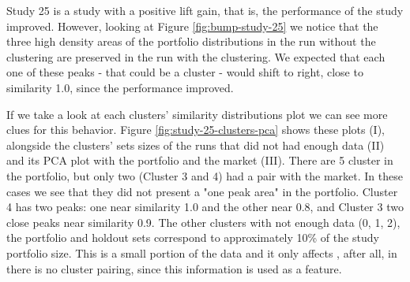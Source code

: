 Study 25 is a study with a positive lift gain, that is, the performance of the study improved. However, looking at Figure \ref{fig:bump-study-25} we notice that the three high density areas of the portfolio distributions in the run without the clustering are preserved in the run with the clustering. We expected that each one of these peaks - that could be a cluster - would shift to right, close to similarity 1.0, since the performance improved. 

If we take a look at each clusters' similarity distributions plot we can see more clues for this behavior. Figure \ref{fig:study-25-clusters-pca} shows these plots (I), alongside the clusters' sets sizes of the runs that did not had enough data (II) and its PCA plot with the portfolio and the market (III). There are 5 cluster in the portfolio, but only two (Cluster 3 and 4) had a pair with the market. In these cases we see that they did not present a "one peak area" in the portfolio. Cluster 4 has two peaks: one near similarity 1.0 and the other near 0.8, and Cluster 3 two close peaks near similarity 0.9. The other clusters with not enough data (0, 1, 2), the portfolio and holdout sets correspond to approximately 10\% of the study portfolio size. This is a small portion of the data and it only affects \nameExperimentI{}, after all, in \nameExperimentII{} there is no cluster pairing, since this information is used as a feature.

